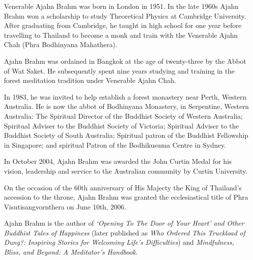 \documentclass[11pt, openany]{book}
\begin{document}
{\small\sffamily
Venerable Ajahn Brahm was born in London in 1951. In the late 1960s Ajahn Brahm won a scholarship to study Theoretical Physics at Cambridge University. After graduating from Cambridge, he taught in high school for one year before travelling to Thailand to become a monk and train with the Venerable Ajahn Chah (Phra Bodhinyana Mahathera).

Ajahn Brahm was ordained in Bangkok at the age of twenty-three by the Abbot of Wat Saket. He subsequently spent nine years studying and training in the forest meditation tradition under Venerable Ajahn Chah.

In 1983, he was invited to help establish a forest monastery near Perth, Western Australia. He is now the abbot of Bodhinyana Monastery, in Serpentine, Western Australia: The Spiritual Director of the Buddhist Society of Western Australia; Spiritual Adviser to the Buddhist Society of Victoria; Spiritual Adviser to the Buddhist Society of South Australia; Spiritual patron of the Buddhist Fellowship in Singapore; and spiritual Patron of the Bodhikusuma Centre in Sydney.

In October 2004, Ajahn Brahm was awarded the John Curtin Medal for his vision, leadership and service to the Australian community by Curtin University.

On the occasion of the 60th anniversary of His Majecty the King of Thailand’s accession to the throne, Ajahn Brahm was granted the ecclesiastical title of Phra Visutisangvornthera on June 10th, 2006.

Ajahn Brahm is the author of \emph{‘Opening To The Door of Your Heart’ and Other Buddhist Tales of Happiness} (later published as \emph{Who Ordered This Truckload of Dung?: Inspiring Stories for Welcoming Life’s Difficulties}) and \emph{Mindfulness, Bliss, and Beyond: A Meditator’s Handbook}.}
\end{document}

